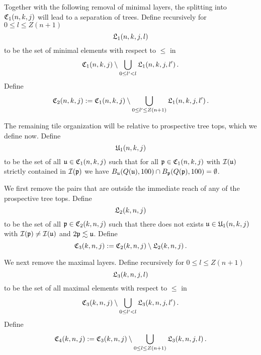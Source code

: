 Together with the following removal of minimal layers, the splitting into $\mathfrak C_1(n,k,j)$ will lead to a separation of  trees.
Define recursively for $0\le l\le Z(n+1)$
\begin{equation}
    \label{eq L1 def}
    \mathfrak L_1(n,k,j,l)
\end{equation}
to be the set of minimal elements with respect to $\le$ in
\begin{equation}
    \mathfrak C_1(n,k,j)\setminus \bigcup_{0\le l'<l}
\mathfrak L_1(n,k,j,l')\, .
\end{equation}
Define 
\begin{equation}
    \label{eq C2 def}
    \mathfrak C_2(n,k,j):= \mathfrak C_1(n,k,j)\setminus \bigcup_{0\le l'\le Z(n+1)}
\mathfrak L_1(n,k,j,l')\, .
\end{equation}

The remaining tile organization will be relative to
prospective tree tops, which we define now.
Define
\begin{equation}\label{defunkj}
     \mathfrak U_1(n,k,j)
\end{equation}
to be the set of all
$\mathfrak u \in \mathfrak C_1(n,k,j)$ such that
for all $\mathfrak p \in \mathfrak C_1(n,k,j)$
with  $\mathcal{I}(\mathfrak u)$ strictly contained in
$\mathcal{I}(\mathfrak p)$ we have $B_{\mathfrak u}(Q(\mathfrak u), 100) \cap B_{\mathfrak p}(Q(\mathfrak p),100) = \emptyset$.

We first remove the pairs that are outside the immediate reach of any of the prospective tree tops.
Define
\begin{equation}
\label{eq L2 def}
\mathfrak L_2(k,n,j)
\end{equation}
to be the set of all $\mathfrak p\in \mathfrak C_2(k,n,j)$ such that there
does not exists
$\mathfrak u\in \mathfrak U_1(n,k,j)$
with $\mathcal{I}(\mathfrak p)\neq \mathcal{I}(\mathfrak u)$ and $2\mathfrak p\lesssim \mathfrak u$.
Define
\begin{equation}
\label{eq C3 def}
\mathfrak C_3(k,n,j):=\mathfrak C_2(k,n,j)
  \setminus \mathfrak L_2(k,n,j)\, .
\end{equation}


We next remove the maximal layers.
Define recursively for $0 \le l \le Z(n+1)$
\begin{equation}
    \label{eq L3 def}
    \mathfrak L_3(k,n,j,l)
\end{equation}
to be the set of all maximal elements with respect to $\le$ in
\begin{equation}
    \mathfrak C_3(k,n,j) \setminus \bigcup_{0 \le l' < l} \mathfrak L_3(k,n,j,l')\,.
\end{equation}
Define
\begin{equation}
\label{eq C4 def}
\mathfrak C_4(k,n,j):=\mathfrak C_3(k,n,j)
  \setminus \bigcup_{0 \le l \le Z(n+1)} \mathfrak L_3(k,n,j,l)\,.
\end{equation}

